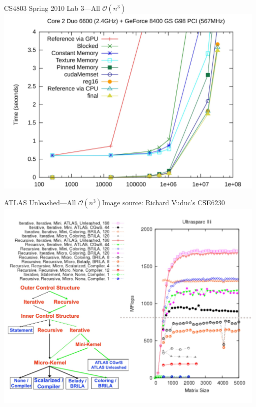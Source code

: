 \documentclass[mathserif,xcolor={dvipsnames,table}]{beamer}
\begin{document}
\begin{frame}{CS4803 Spring 2010 Lab 3---All $\mathcal{O}(n^{3})$}
\includegraphics[width=.8\paperwidth]{images/lab3.jpg}
\end{frame}

\begin{frame}{ATLAS Unleashed---All $\mathcal{O}(n^{3})$\hfill\tiny{Image source: Richard Vuduc's CSE6230}}
\includegraphics[width=.8\paperwidth]{images/vuduc.jpg}
\end{frame}
\end{document}

